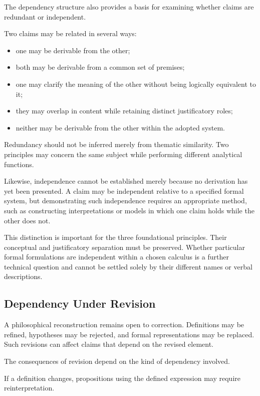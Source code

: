 The dependency structure also provides a basis for examining
whether claims are redundant or independent.

Two claims may be related in several ways:

\begin{itemize}
    \item one may be derivable from the other;
    \item both may be derivable from a common set of premises;
    \item one may clarify the meaning of the other without
    being logically equivalent to it;
    \item they may overlap in content while retaining distinct
    justificatory roles;
    \item neither may be derivable from the other within the
    adopted system.
\end{itemize}

Redundancy should not be inferred merely from thematic
similarity. Two principles may concern the same subject while
performing different analytical functions.

Likewise, independence cannot be established merely because
no derivation has yet been presented. A claim may be
independent relative to a specified formal system, but
demonstrating such independence requires an appropriate
method, such as constructing interpretations or models in
which one claim holds while the other does not.

This distinction is important for the three foundational
principles. Their conceptual and justificatory separation
must be preserved. Whether particular formal formulations
are independent within a chosen calculus is a further
technical question and cannot be settled solely by their
different names or verbal descriptions.

\subsection{Dependency Under Revision}

A philosophical reconstruction remains open to correction.
Definitions may be refined, hypotheses may be rejected,
and formal representations may be replaced. Such revisions
can affect claims that depend on the revised element.

The consequences of revision depend on the kind of dependency
involved.

If a definition changes, propositions using the defined
expression may require reinterpretation.

